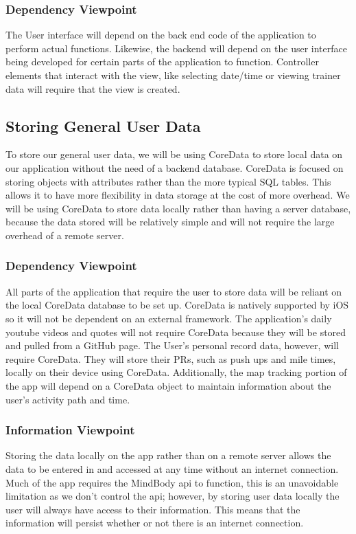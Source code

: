 \documentclass[letterpaper,10pt,titlepage]{article}
\begin{document}
\subsubsection{Dependency Viewpoint}
The User interface will depend on the back end code of the application to perform actual functions. Likewise, the backend will depend on the user interface being developed for certain parts of the application to function. Controller elements that interact with the view, like selecting date/time or viewing trainer data will require that the view is created.



\subsection{Storing General User Data}
To store our general user data, we will be using CoreData to store local data on our application without the need of a backend database. CoreData is focused on storing objects with attributes rather than the more typical SQL tables. This allows it to have more flexibility in data storage at the cost of more overhead. We will be using CoreData to store data locally rather than having a server database, because the data stored will be relatively simple and will not require the large overhead of a remote server.

\subsubsection{Dependency Viewpoint}
All parts of the application that require the user to store data will be reliant on the local CoreData database to be set up. CoreData is natively supported by iOS so it will not be dependent on an external framework. The application’s daily youtube videos and quotes will not require CoreData because they will be stored and pulled from a GitHub page. The User’s personal record data, however, will require CoreData. They will store their PRs, such as push ups and mile times, locally on their device using CoreData. Additionally, the map tracking portion of the app will depend on a CoreData object to maintain information about the user’s activity path and time.

\subsubsection{Information Viewpoint}
Storing the data locally on the app rather than on a remote server allows the data to be entered in and accessed at any time without an internet connection. Much of the app requires the MindBody api to function, this is an unavoidable limitation as we don’t control the api; however, by storing user data locally the user will always have access to their information. This means that the information will persist whether or not there is an internet connection.
\end{document}
